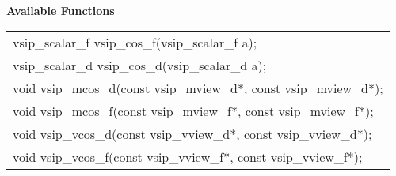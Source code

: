 \\\cvsiplh
\newline \hspace*{.8cm} \vspace*{.1cm} \textbf{Available Functions }
\newline \hspace*{1.1cm} {
\ttfamily
\begin{tabular}[H]{l}
vsip\_scalar\_f vsip\_cos\_f(vsip\_scalar\_f a);\\
vsip\_scalar\_d vsip\_cos\_d(vsip\_scalar\_d a);\\
void vsip\_mcos\_d(const vsip\_mview\_d*, const vsip\_mview\_d*);\\
void vsip\_mcos\_f(const vsip\_mview\_f*, const vsip\_mview\_f*);\\
void vsip\_vcos\_d(const vsip\_vview\_d*, const vsip\_vview\_d*);\\
void vsip\_vcos\_f(const vsip\_vview\_f*, const vsip\_vview\_f*);\\
\end{tabular}
}
\\\pyjvsiph
{}
